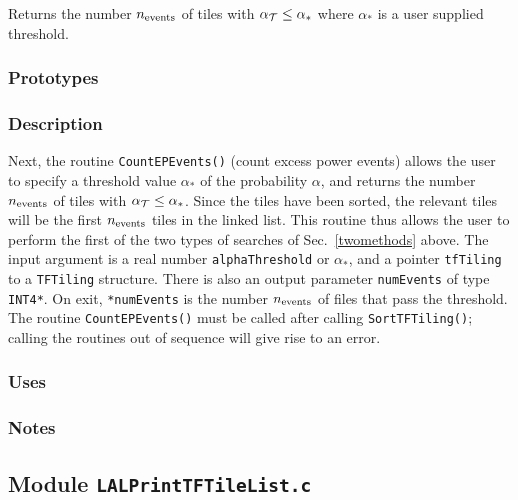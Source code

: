 Returns the number $n_{\rm events}$ of tiles with $\alpha_{\cal T} \le
\alpha_*$ where $\alpha_*$ is a user supplied threshold.

\subsubsection*{Prototypes}
\vspace{0.1in}


\subsubsection*{Description}

Next, the routine \verb+CountEPEvents()+ (count excess power events) allows
the user to specify a threshold value $\alpha_*$ of the probability $\alpha$,
and returns the number $n_{\rm events}$ of tiles with $\alpha_{\cal T} \le
\alpha_*$.  Since the tiles have been sorted, the relevant tiles will be the
first $n_{\rm events}$ tiles in the linked list.  This routine thus allows the
user to perform the first of the two types of searches of Sec.\
\ref{twomethods} above.  The input argument is a real number
\verb+alphaThreshold+ or $\alpha_*$, and a pointer \verb+tfTiling+ to a
\verb+TFTiling+ structure.  There is also an output parameter \verb+numEvents+
of type \verb+INT4*+.  On exit, \verb+*numEvents+ is the number $n_{\rm
events}$ of files that pass the threshold.  The routine \verb+CountEPEvents()+
must be called after calling \verb+SortTFTiling()+; calling the routines out
of sequence will give rise to an error.

\subsubsection*{Uses}

\subsubsection*{Notes}

\vfill{\footnotesize}

\newpage
\subsection{Module \texttt{LALPrintTFTileList.c}}
\label{ss:LALPrintTFTileList.c}

